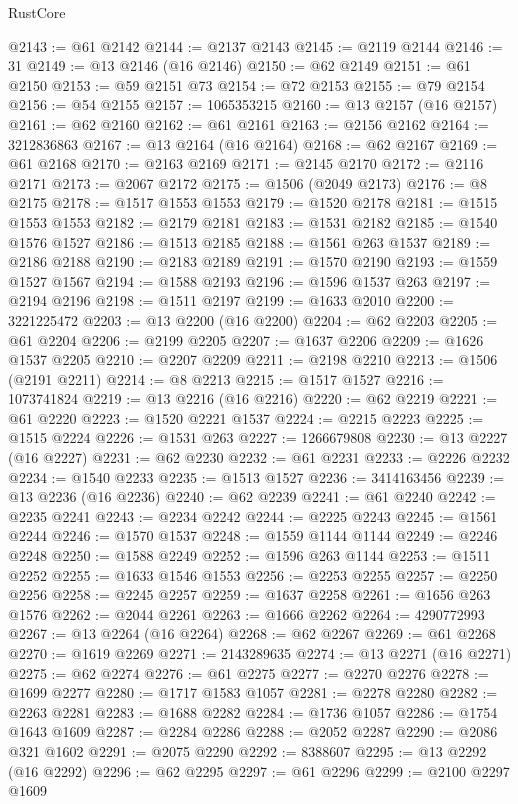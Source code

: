 \begin{lexlean}{RustCore}
\begin{coremodule}
@2143 := @61 @2142
@2144 := @2137 @2143
@2145 := @2119 @2144
@2146 := 31
@2149 := @13 @2146 (@16 @2146)
@2150 := @62 @2149
@2151 := @61 @2150
@2153 := @59 @2151 @73
@2154 := @72 @2153
@2155 := @79 @2154
@2156 := @54 @2155
@2157 := 1065353215
@2160 := @13 @2157 (@16 @2157)
@2161 := @62 @2160
@2162 := @61 @2161
@2163 := @2156 @2162
@2164 := 3212836863
@2167 := @13 @2164 (@16 @2164)
@2168 := @62 @2167
@2169 := @61 @2168
@2170 := @2163 @2169
@2171 := @2145 @2170
@2172 := @2116 @2171
@2173 := @2067 @2172
@2175 := @1506 (@2049 @2173)
@2176 := @8 @2175
@2178 := @1517 @1553 @1553
@2179 := @1520 @2178
@2181 := @1515 @1553 @1553
@2182 := @2179 @2181
@2183 := @1531 @2182
@2185 := @1540 @1576 @1527
@2186 := @1513 @2185
@2188 := @1561 @263 @1537
@2189 := @2186 @2188
@2190 := @2183 @2189
@2191 := @1570 @2190
@2193 := @1559 @1527 @1567
@2194 := @1588 @2193
@2196 := @1596 @1537 @263
@2197 := @2194 @2196
@2198 := @1511 @2197
@2199 := @1633 @2010
@2200 := 3221225472
@2203 := @13 @2200 (@16 @2200)
@2204 := @62 @2203
@2205 := @61 @2204
@2206 := @2199 @2205
@2207 := @1637 @2206
@2209 := @1626 @1537 @2205
@2210 := @2207 @2209
@2211 := @2198 @2210
@2213 := @1506 (@2191 @2211)
@2214 := @8 @2213
@2215 := @1517 @1527
@2216 := 1073741824
@2219 := @13 @2216 (@16 @2216)
@2220 := @62 @2219
@2221 := @61 @2220
@2223 := @1520 @2221 @1537
@2224 := @2215 @2223
@2225 := @1515 @2224
@2226 := @1531 @263
@2227 := 1266679808
@2230 := @13 @2227 (@16 @2227)
@2231 := @62 @2230
@2232 := @61 @2231
@2233 := @2226 @2232
@2234 := @1540 @2233
@2235 := @1513 @1527
@2236 := 3414163456
@2239 := @13 @2236 (@16 @2236)
@2240 := @62 @2239
@2241 := @61 @2240
@2242 := @2235 @2241
@2243 := @2234 @2242
@2244 := @2225 @2243
@2245 := @1561 @2244
@2246 := @1570 @1537
@2248 := @1559 @1144 @1144
@2249 := @2246 @2248
@2250 := @1588 @2249
@2252 := @1596 @263 @1144
@2253 := @1511 @2252
@2255 := @1633 @1546 @1553
@2256 := @2253 @2255
@2257 := @2250 @2256
@2258 := @2245 @2257
@2259 := @1637 @2258
@2261 := @1656 @263 @1576
@2262 := @2044 @2261
@2263 := @1666 @2262
@2264 := 4290772993
@2267 := @13 @2264 (@16 @2264)
@2268 := @62 @2267
@2269 := @61 @2268
@2270 := @1619 @2269
@2271 := 2143289635
@2274 := @13 @2271 (@16 @2271)
@2275 := @62 @2274
@2276 := @61 @2275
@2277 := @2270 @2276
@2278 := @1699 @2277
@2280 := @1717 @1583 @1057
@2281 := @2278 @2280
@2282 := @2263 @2281
@2283 := @1688 @2282
@2284 := @1736 @1057
@2286 := @1754 @1643 @1609
@2287 := @2284 @2286
@2288 := @2052 @2287
@2290 := @2086 @321 @1602
@2291 := @2075 @2290
@2292 := 8388607
@2295 := @13 @2292 (@16 @2292)
@2296 := @62 @2295
@2297 := @61 @2296
@2299 := @2100 @2297 @1609

\end{coremodule}
\end{lexlean}
